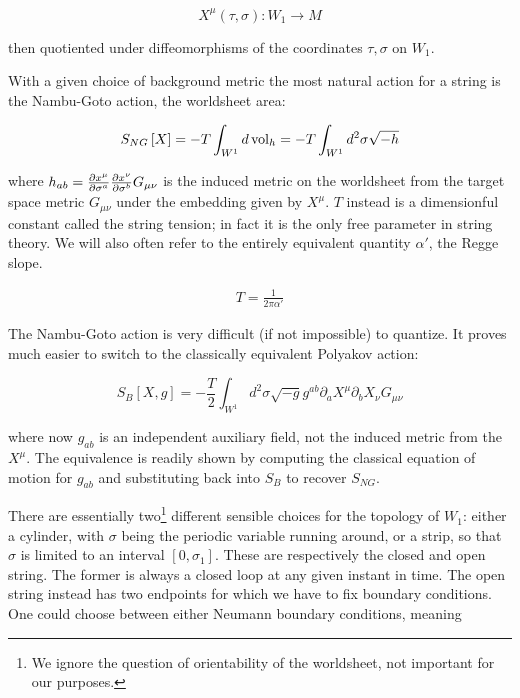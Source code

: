 \begin{equation}
	X^{\mu} (\tau,\sigma) : W_1 \rightarrow M
	\label{}
\end{equation}

then quotiented under diffeomorphisms of the coordinates $\tau,\sigma$ on $W_1$.

With a given choice of background metric the most natural action for a string is the Nambu-Goto action, the worldsheet area:

\begin{equation}
	S_{NG}\left[ X \right] = - T \int_{W^1} d\operatorname{vol}_h = - T \int_{W^1} d^2 \sigma \sqrt{-h}
	\label{}
\end{equation}

where $h_{ab} = \frac{\partial x^\mu}{\partial\sigma^a} \frac{\partial x^\nu}{\partial\sigma^b} G_{\mu\nu}$ is the induced metric on the worldsheet from the target space metric $G_{\mu\nu}$ under the embedding given by $X^\mu$. $T$ instead is a dimensionful constant called the string tension; in fact it is the only free parameter in string theory. We will also often refer to the entirely equivalent quantity $\alpha'$, the Regge slope.

\begin{align}
	T = \frac{1}{2\pi\alpha'}
	\label{}
\end{align}

The Nambu-Goto action is very difficult (if not impossible) to quantize. It proves much easier to switch to the classically equivalent Polyakov action: 

\begin{equation}\label{polyakov}
	S_B\left[ X,g \right] = -\frac{T}{2} \int_{W^1} d^2\sigma \sqrt{-g} g^{ab} \partial_a X^\mu \partial_b X_\nu G_{\mu\nu}
\end{equation}


where now $g_{ab}$ is an independent auxiliary field, not the induced metric from the $X^\mu$. The equivalence is readily shown by computing the classical equation of motion for $g_{ab}$ and substituting back into $S_B$ to recover $S_{NG}$.


There are essentially two\footnote{We ignore the question of orientability of the worldsheet, not important for our purposes.} different sensible choices for the topology of $W_1$: either a cylinder, with $\sigma$ being the periodic variable running around, or a strip, so that $\sigma$ is limited to an interval $[0,\sigma_1]$. These are respectively the closed and open string. The former is always a closed loop at any given instant in time. The open string instead has two endpoints for which we have to fix boundary conditions.  One could choose between either Neumann boundary conditions, meaning


